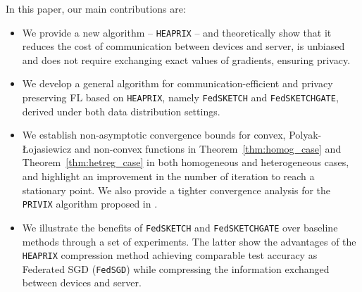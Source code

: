 \documentclass[twoside]{article}
\newcommand{\pl}{Polyak-\L{}ojasiewicz}
\newcommand{\todo}[1]{\textcolor{red}{ToDo:~#1}}
\begin{document}
In this paper, our main contributions are:
\begin{itemize}
    \item We provide a new algorithm -- \texttt{HEAPRIX} -- and theoretically show that it reduces the cost of communication between devices and server, is unbiased and does not require exchanging exact values of gradients, ensuring privacy.
    \item We develop a general algorithm for communication-efficient and privacy preserving FL based on \texttt{HEAPRIX}, namely \texttt{FedSKETCH} and \texttt{FedSKETCHGATE}, derived under both data distribution settings.
    \item We establish non-asymptotic convergence bounds for convex, \pl\: and non-convex functions in Theorem~\ref{thm:homog_case} and Theorem~\ref{thm:hetreg_case} in both homogeneous and heterogeneous cases, and highlight an improvement in the number of iteration to reach a stationary point.
We also provide a tighter convergence analysis for the \texttt{PRIVIX} algorithm proposed in \cite{li2019privacy}.
    \item We illustrate the benefits of \texttt{FedSKETCH} and \texttt{FedSKETCHGATE} over baseline methods through a set of experiments. 
    The latter show the advantages of the \texttt{HEAPRIX} compression method achieving comparable test accuracy as Federated SGD (\texttt{FedSGD}) while compressing the information exchanged between devices and server.
\end{itemize}


\end{document}
